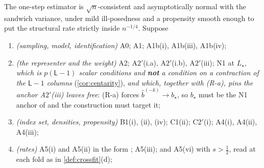 
\begin{theorem}\label{thm:rootn}
The one-step estimator is $\sqrt n$-consistent and asymptotically normal with the sandwich variance, under
mild ill-posedness and a propensity smooth enough to put the structural rate strictly inside $n^{-1/4}$.
Suppose
\begin{enumerate}
\item[(T-1)] \emph{(sampling, model, identification)} A0; A1; A1b(i), A1b(iii), A1b(iv);
\item[(T-2)] \emph{(the representer and the weight)} A2; A$2'$(i.a), A$2'$(i.b), A$2'$(iii); N1 at
$L_\star$, \emph{which is $p(\mathsf L-1)$ scalar conditions and \textbf{not} a condition on a
contraction of the $\mathsf L-1$ columns} (\cref{cor:centarity}), \emph{and which, together with
\textup{(R-a)}, pins the anchor A$2'$\textup{(iii)} leaves free}: \textup{(R-a)} forces
$\hat b^{(-k)}\to b_\star$, so $b_\star$ must be the N1 anchor of  and the
construction must target it;
\item[(T-3)] \emph{(index set, densities, propensity)} B1(i), (ii), (iv); C1(ii); C2$'$(i); A4(i),
A4(ii), A4(iii);
\item[(T-4)] \emph{(rates)} A5(i) and A5(ii) in the form ; A5(iii); and A5(vi) with
$s>\tfrac12$, read at each fold as in \cref{def:crossfit}(d);

\end{enumerate}
\end{theorem}
